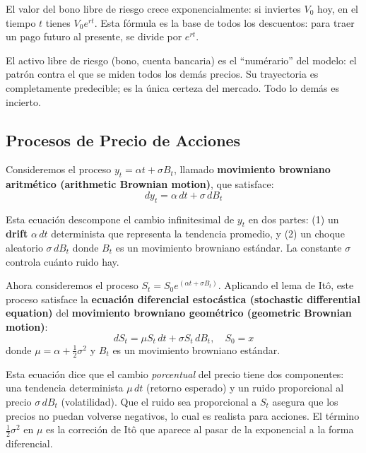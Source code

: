 \documentclass[12pt]{article}
\begin{document}
\begin{intuicionmat}
El valor del bono libre de riesgo crece exponencialmente: si inviertes $V_0$ hoy, en el tiempo $t$ tienes $V_0 e^{rt}$. Esta f\'ormula es la base de todos los descuentos: para traer un pago futuro al presente, se divide por $e^{rt}$.
\end{intuicionmat}

\begin{intuicion}
El activo libre de riesgo (bono, cuenta bancaria) es el ``num\'erario'' del modelo: el patr\'on contra el que se miden todos los dem\'as precios. Su trayectoria es completamente predecible; es la \'unica certeza del mercado. Todo lo dem\'as es incierto.
\end{intuicion}

\subsection{Procesos de Precio de Acciones}

Consideremos el proceso $y_t = \alpha t + \sigma B_t$, llamado \textbf{movimiento browniano aritm\'etico (arithmetic Brownian motion)}, que satisface:
\begin{equation}
  dy_t = \alpha \, dt + \sigma \, dB_t
\end{equation}

\begin{intuicionmat}
Esta ecuaci\'on descompone el cambio infinitesimal de $y_t$ en dos partes: (1) un \textbf{drift} $\alpha\,dt$ determinista que representa la tendencia promedio, y (2) un choque aleatorio $\sigma\,dB_t$ donde $B_t$ es un movimiento browniano est\'andar. La constante $\sigma$ controla cu\'anto ruido hay.
\end{intuicionmat}

Ahora consideremos el proceso $S_t = S_0 e^{(\alpha t + \sigma B_t)}$. Aplicando el lema de It\^o, este proceso satisface la \textbf{ecuaci\'on diferencial estoc\'astica (stochastic differential equation)} del \textbf{movimiento browniano geom\'etrico (geometric Brownian motion)}:
\begin{equation}
  dS_t = \mu S_t \, dt + \sigma S_t \, dB_t, \quad S_0 = x
\end{equation}
donde $\mu = \alpha + \frac{1}{2}\sigma^2$ y $B_t$ es un movimiento browniano est\'andar.

\begin{intuicionmat}
Esta ecuaci\'on dice que el cambio \textit{porcentual} del precio tiene dos componentes: una tendencia determinista $\mu\,dt$ (retorno esperado) y un ruido proporcional al precio $\sigma\,dB_t$ (volatilidad). Que el ruido sea proporcional a $S_t$ asegura que los precios no puedan volverse negativos, lo cual es realista para acciones. El t\'ermino $\frac{1}{2}\sigma^2$ en $\mu$ es la correci\'on de It\^o que aparece al pasar de la exponencial a la forma diferencial.
\end{intuicionmat}
\end{document}
